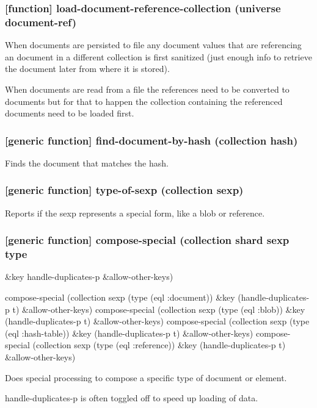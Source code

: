 \documentclass[11pt]{article}
\begin{document}
\subsubsection{[function] load-document-reference-collection (universe document-ref)}
\label{sec:org45bae15}

When documents are persisted to file any document values that are
referencing an document in a different collection is first sanitized
(just enough info to retrieve the document later from where it is
stored).

When documents are read from a file the references need to be
converted to documents but for that to happen the collection
containing the referenced documents need to be loaded first.

\subsubsection{[generic function] find-document-by-hash (collection hash)}
\label{sec:org7e04792}

Finds the document that matches the hash.

\subsubsection{[generic function] type-of-sexp (collection sexp)}
\label{sec:org775be3f}

Reports if the sexp represents a special form, like a blob or reference.

\subsubsection{[generic function] compose-special (collection shard sexp type}
\label{sec:org9a6ec67}
\&key handle-duplicates-p \&allow-other-keys)

compose-special (collection sexp (type (eql :document)) \&key (handle-duplicates-p t) \&allow-other-keys)
compose-special (collection sexp (type (eql :blob)) \&key (handle-duplicates-p t) \&allow-other-keys)
compose-special (collection sexp (type (eql :hash-table)) \&key (handle-duplicates-p t) \&allow-other-keys)
compose-special (collection sexp (type (eql :reference)) \&key (handle-duplicates-p t) \&allow-other-keys)

Does special processing to compose a specific type of document or element.

handle-duplicates-p is often toggled off to speed up loading of data.
\end{document}
